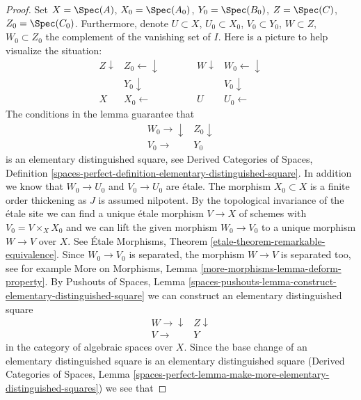 \begin{proof}
Set $X = \Spec(A)$, $X_0 = \Spec(A_0)$, $Y_0 = \Spec(B_0)$,
$Z = \Spec(C)$, $Z_0 = \Spec(C_0)$. Furthermore, denote
$U \subset X$, $U_0 \subset X_0$, $V_0 \subset Y_0$,
$W \subset Z$, $W_0 \subset Z_0$ the complement of the
vanishing set of $I$. Here is a picture to help visualize the
situation:
$$
\begin{array}{cc}Z \downarrow & Z_0 \longleftarrow\downarrow \\  & Y_0 \downarrow \\ X & X_0 \longleftarrow\end{array}
\quad\quad\quad
\begin{array}{cc}W \downarrow & W_0 \longleftarrow\downarrow \\  & V_0 \downarrow \\ U & U_0 \longleftarrow\end{array}
$$
The conditions in the lemma guarantee that
$$
\begin{array}{cc}W_0 \longrightarrow\downarrow & Z_0 \downarrow \\ V_0 \longrightarrow & Y_0\end{array}
$$
is an elementary distinguished square, see
Derived Categories of Spaces, Definition
\ref{spaces-perfect-definition-elementary-distinguished-square}.
In addition we know that
$W_0 \to U_0$ and $V_0 \to U_0$ are \'etale. The morphism
$X_0 \subset X$ is a finite order thickening as $J$ is assumed nilpotent.
By the topological invariance of the \'etale site
we can find a unique \'etale morphism $V \to X$ of schemes
with $V_0 = V \times_X X_0$ and we can lift the given morphism
$W_0 \to V_0$ to a unique morphism $W \to V$ over $X$.
See \'Etale Morphisms, Theorem
\ref{etale-theorem-remarkable-equivalence}.
Since $W_0 \to V_0$ is separated, the morphism $W \to V$ is separated too,
see for example
More on Morphisms, Lemma \ref{more-morphisms-lemma-deform-property}.
By Pushouts of Spaces, Lemma
\ref{spaces-pushouts-lemma-construct-elementary-distinguished-square}
we can construct an elementary distinguished square
$$
\begin{array}{cc}W \longrightarrow\downarrow & Z \downarrow \\ V \longrightarrow & Y\end{array}
$$
in the category of algebraic spaces over $X$. Since the base change
of an elementary distinguished square is an elementary distinguished
square (Derived Categories of Spaces, Lemma
\ref{spaces-perfect-lemma-make-more-elementary-distinguished-squares})
we see that

\end{proof}
